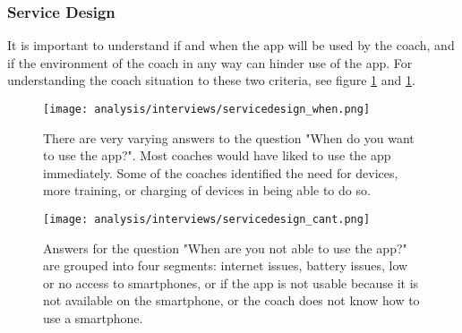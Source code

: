 \clearpage

\subsubsection{Service Design}

It is important to understand if and when the app will be used by the coach, and if the environment of the coach in any way can hinder use of the app. For understanding the coach situation to these two criteria, see figure \ref{fig:servicedesign1} and \ref{fig:servicedesign1}.

\begin{figure}[h]
    \centering
    \texttt{[image: analysis/interviews/servicedesign\_when.png]}
    \caption{There are very varying answers to the question "When do you want to use the app?". Most coaches would have liked to use the app immediately. Some of the coaches identified the need for devices, more training, or charging of devices in being able to do so.}
    \label{fig:servicedesign1}
\end{figure}

\begin{figure}[h]
    \centering
    \texttt{[image: analysis/interviews/servicedesign\_cant.png]}
    \caption{Answers for the question "When are you not able to use the app?" are grouped into four segments: internet issues, battery issues, low or no access to smartphones, or if the app is not usable because it is not available on the smartphone, or the coach does not know how to use a smartphone.}
    \label{fig:servicedesign2}
\end{figure}

\clearpage
